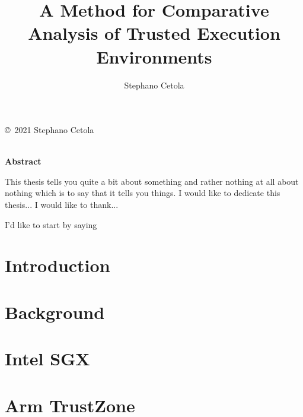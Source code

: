 \documentclass[12pt,oneside,letterpaper,hidelinks]{PSUreport}
\begin{document}
\title{A Method for Comparative Analysis of Trusted Execution Environments}
\subtitle{}
\author{Stephano Cetola}
\submitdate{\today}

\copyrightfalse
\figurespagetrue
\tablespagetrue
\beforepreface
{}
\null\vfill
\begin{center}
        \copyright\ 2021 Stephano Cetola \\
        \doclicenseLongText \\
        \vspace{5 mm}
        \doclicenseImage
\end{center}
\vfill\newpage
{}
\centerline{\textbf{Abstract}}
This thesis tells you quite a bit about something and rather nothing at all about nothing which is to say that it tells you things.
I would like to dedicate this thesis...
I would like to thank...
\afterpreface

\printglossary[type=\acronymtype]
\printglossary

I'd like to start by saying




\glsresetall
\chapter{Introduction}
\label{chap:intro}


\glsresetall
\chapter{Background}
\label{chap:bg}


\glsresetall
\chapter{Intel SGX}
\label{chap:sgx}


\glsresetall
\chapter{Arm TrustZone}
\label{chap:trustzone}

\end{document}
